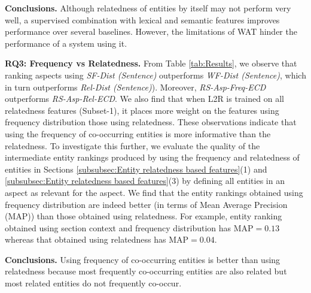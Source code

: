 \textbf{Conclusions.}
Although relatedness of entities by itself may not perform very well, a supervised combination with lexical and semantic features improves performance over several baselines. However, the limitations of WAT hinder the performance of a system using it.


\textbf{RQ3: Frequency vs Relatedness.}
From Table \ref{tab:Results}, we observe that ranking aspects using \textit{SF-Dist (Sentence)} outperforms \textit{WF-Dist (Sentence)}, which in turn outperforms \textit{Rel-Dist (Sentence)}). Moreover, \textit{RS-Asp-Freq-ECD} outperforms \textit{RS-Asp-Rel-ECD}. We also find that when L2R is trained on all relatedness features (Subset-1), it places more weight on the features using frequency distribution those using relatedness. These observations indicate that using the frequency of co-occurring entities is more informative than the relatedness. To investigate this further, we evaluate the quality of the intermediate entity rankings produced by using the frequency and relatedness of entities in Sections \ref{subsubsec:Entity relatedness based features}(1) and \ref{subsubsec:Entity relatedness based features}(3) by defining all entities in an aspect as relevant for the aspect. We find that the entity rankings obtained using frequency distribution are indeed better (in terms of
Mean Average Precision (MAP)) than those obtained using relatedness. For example, entity ranking obtained using section context and frequency distribution has $\text{MAP}=0.13$ whereas that obtained using relatedness has $\text{MAP}=0.04$. 

\textbf{Conclusions.} Using frequency of co-occurring entities is better than using relatedness because most frequently co-occurring entities are also related but most related entities do not frequently co-occur.
